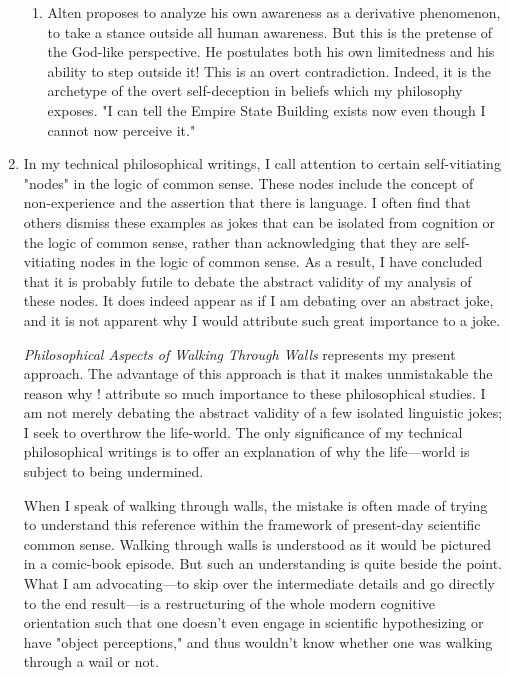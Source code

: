 \documentclass[10pt,twoside,draft]{memoir}
\newcommand{\essaytitle}[1]{
	\emph{#1}}
\begin{document}
\begin{enumerate}
\begin{enumerate}
\item Alten proposes to analyze his own awareness as a derivative 
phenomenon, to take a stance outside all human awareness. But this is the 
pretense of the God-like perspective. He postulates both his own limitedness 
and his ability to step outside it! This is an overt contradiction. Indeed, it is 
the archetype of the overt self-deception in beliefs which my philosophy 
exposes. "I can tell the Empire State Building exists now even though I 
cannot now perceive it." 
\end{enumerate}

\item In my technical philosophical writings, I call attention to certain 
self-vitiating "nodes" in the logic of common sense. These nodes include the 
concept of non-experience and the assertion that there is language. I often 
find that others dismiss these examples as jokes that can be isolated from 
cognition or the logic of common sense, rather than acknowledging that they 
are self-vitiating nodes in the logic of common sense. As a result, I have 
concluded that it is probably futile to debate the abstract validity of my 
analysis of these nodes. It does indeed appear as if I am debating over an 
abstract joke, and it is not apparent why I would attribute such great 
importance to a joke. 

\essaytitle{Philosophical Aspects of Walking Through Walls} represents my 
present approach. The advantage of this approach is that it makes 
unmistakable the reason why ! attribute so much importance to these 
philosophical studies. I am not merely debating the abstract validity of a few 
isolated linguistic jokes; I seek to overthrow the life-world. The only 
significance of my technical philosophical writings is to offer an explanation 
of why the life---world is subject to being undermined. 

When I speak of walking through walls, the mistake is often made of 
trying to understand this reference within the framework of present-day 
scientific common sense. Walking through walls is understood as it would be 
pictured in a comic-book episode. But such an understanding is quite beside 
the point. What I am advocating---to skip over the intermediate details and go 
directly to the end result---is a restructuring of the whole modern cognitive 
orientation such that one doesn't even engage in scientific hypothesizing or 
have "object perceptions," and thus wouldn't know whether one was 
walking through a wail or not. 


\end{enumerate}
\end{document}
